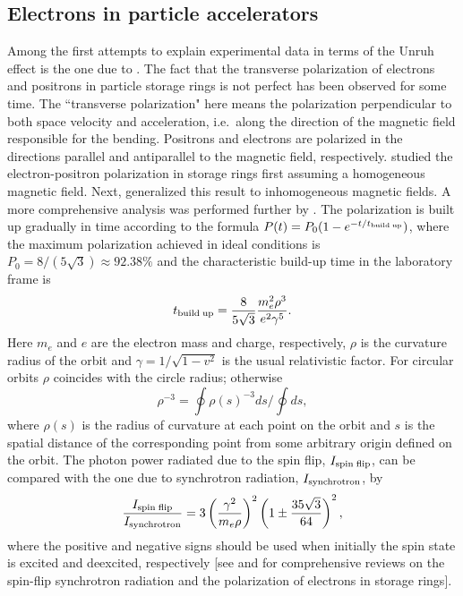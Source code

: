 \documentclass[12pt,nofootinbib,floatfix,aps,prd,showpacs,amsmath,amssymb,eqsecnum]{revtex4-2}
\begin{document}
\subsection{Electrons in particle accelerators}
\label{subsection:polarization}

Among the first attempts to explain experimental data in terms of the 
Unruh effect is the one due to \textcite{Belletal83}. The fact that the 
transverse polarization of electrons and positrons in particle storage 
rings is not perfect has been observed for some time. The ``transverse 
polarization" here means the polarization perpendicular to both space 
velocity and acceleration, i.e.~along the direction of the magnetic
field responsible for the bending. Positrons and electrons are polarized 
in the directions 
parallel and antiparallel to the magnetic field, respectively. 
\textcite{Sokolovetal63} studied the electron-positron
polarization in storage rings first assuming a homogeneous magnetic 
field. Next, \textcite{Baieretal67}
generalized this result to inhomogeneous magnetic fields.
A more comprehensive analysis was performed further by
\textcite{Derbenevetal73}. 
The polarization is built up gradually in time according to the formula 
$
P(t) = P_0 (1-e^{-t/t_{{\rm build}\;{\rm up}}})
$, 
where the maximum polarization achieved in ideal conditions is 
$
P_0 = 8/(5\sqrt{3}) \approx 92.38 \%
$
and the characteristic build-up time in the laboratory frame is
$$
t_{{\rm build}\;{\rm up}} = \frac{8 }{ 5 \sqrt{3} } 
                             \frac{m_e^2 \rho^3 }{e^2 \gamma^5}.
$$
Here $m_e$ and $e$ are the electron mass and charge, respectively,
$\rho$ is the curvature radius of the orbit and
$\gamma = 1/\sqrt{1-v^2}$ is the usual relativistic factor.
For circular orbits $\rho$ coincides with the circle radius;
otherwise
$$
\rho^{-3} = \oint \rho(s)^{-3} ds \bigg/ \oint ds,
$$
where $\rho (s)$ is the radius of curvature at each
point on the orbit and $ s $ is the spatial distance 
of the corresponding point from some 
arbitrary origin defined on the orbit.
The photon power radiated due to the spin flip, 
$ I_{{\rm spin}\; {\rm flip}}$, can be compared with
the one due to synchrotron radiation, $I_{\rm synchrotron}$,
by
$$
\frac{I_{{\rm spin}\; {\rm flip}}}{I_{\rm synchrotron}}
= 3 \left(\frac{\gamma^2}{m_e \rho} \right)^2 
    \left(1\pm \frac{35 \sqrt{3}}{64}\right)^2,
$$
where the positive and negative signs 
should be used when initially the spin state 
is excited and deexcited, respectively [see \textcite{Jackson76} 
and \textcite{Montage84} for comprehensive reviews on the spin-flip 
synchrotron radiation and the 
polarization of electrons in storage rings]. 
\end{document}
